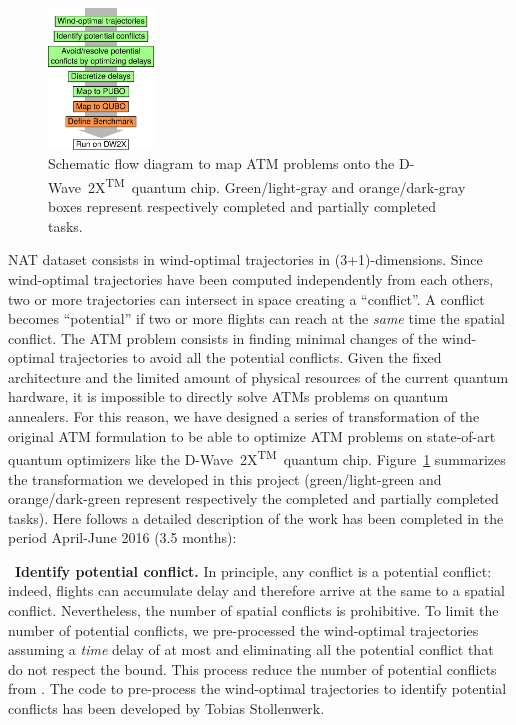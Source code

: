 \documentclass[9pt]{extarticle}
\renewcommand{\figurename}{Figure}
\newcommand{\note}[1][]{\added[remark={#1}]}
\newcommand{\DW}{\mbox{D-Wave 2X\textsuperscript{TM}}~}
\begin{document}
%
\begin{figure}
\centering
\includegraphics[width=0.25\textwidth]{scheme}
\caption{\label{fig:scheme}Schematic flow diagram to map ATM problems onto the \DW quantum chip. Green/light-gray and orange/dark-gray boxes represent
respectively completed and partially completed tasks.}
\end{figure}
%
NAT dataset consists in \note[What is the number of trajectories?]{XXX} wind-optimal trajectories in (3+1)-dimensions. Since wind-optimal
trajectories have been computed independently from each others, two or more trajectories can intersect in space creating a ``conflict''. 
A conflict becomes ``potential'' if two or more flights can reach at the \emph{same} time the spatial conflict. The ATM problem consists
in finding minimal changes of the wind-optimal trajectories to avoid all the potential conflicts. 
Given the fixed architecture and the limited amount of physical resources of the current quantum hardware, it is impossible to directly solve ATMs problems
on quantum annealers. For this reason, we have designed a series of transformation of the original ATM formulation 
to be able to optimize ATM problems on state-of-art quantum optimizers like the \DW quantum chip. \figurename~\ref{fig:scheme} summarizes the transformation 
we developed in this project (green/light-green and orange/dark-green represent respectively the completed and partially completed tasks).
Here follows a detailed description of the work has been completed in the period April-June 2016 (3.5 months):

\begin{changemargin}{0.5cm}{0cm}
\textbullet~\textbf{Identify potential conflict.} In principle, any conflict is a potential conflict: indeed, flights can accumulate delay
and therefore arrive at the same to a spatial conflict. Nevertheless, the number of spatial conflicts is prohibitive. To limit the number
of potential conflicts, we pre-processed the wind-optimal trajectories assuming a \emph{time} delay of at most \note[Check this]{$1$ hour} and
eliminating all the potential conflict that do not respect the bound. This process reduce the number of potential conflicts from
\note[Please add some numbers.]{XXX to XXX}. The code to pre-process the wind-optimal trajectories to identify potential conflicts has
been developed by Tobias Stollenwerk.
\end{changemargin}
\end{document}
